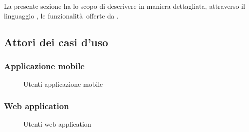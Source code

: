 \documentclass[../analisi-dei-requisiti.tex]{subfiles}
\begin{document}
La presente sezione ha lo scopo di descrivere in maniera dettagliata, attraverso il linguaggio , le funzionalità offerte da .

\subsection{Attori dei casi d'uso}%
\label{sub:attori_casi_duso}

\subsubsection{Applicazione mobile}%
\label{subs:mobile_app}

\begin{figure}[H]
  \centering
  \caption{Utenti applicazione mobile}%
  \label{fig:usersapp}
\end{figure}

\subsubsection{Web application}%
\label{subs:web_application}

\begin{figure}[H]
  \centering
  \caption{Utenti web application}%
  \label{fig:usersweb}
\end{figure}
\end{document}
